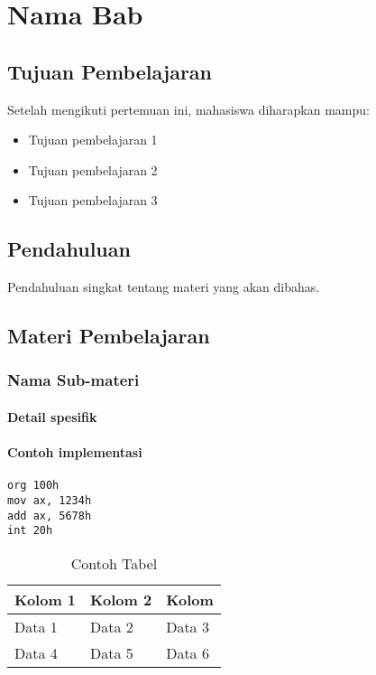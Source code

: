 \chapter{Nama Bab}\label{ch:label-bab}

\section{Tujuan Pembelajaran}\label{sec:label-bab-tujuan}
Setelah mengikuti pertemuan ini, mahasiswa diharapkan mampu:
\begin{itemize}
    \item Tujuan pembelajaran 1
    \item Tujuan pembelajaran 2
    \item Tujuan pembelajaran 3
\end{itemize}

\section{Pendahuluan}\label{sec:label-bab-pendahuluan}
Pendahuluan singkat tentang materi yang akan dibahas.

\section{Materi Pembelajaran}\label{sec:label-bab-materi}
\subsection{Nama Sub-materi}\label{subsec:label-bab-submateri}
\subsubsection{Detail spesifik}

\subsubsection{Contoh implementasi}

\begin{lstlisting}[caption=Contoh Kode Assembly, label={code:contoh}]
org 100h
mov ax, 1234h
add ax, 5678h
int 20h
\end{lstlisting}

\begin{table}[h]
    \centering
    \caption{Contoh Tabel}
    \begin{tabular}{lll}
        \toprule
        \textbf{Kolom 1} & \textbf{Kolom 2} & \textbf{Kolom} \\
        \midrule
        Data 1 & Data 2 & Data 3 \\
        Data 4 & Data 5 & Data 6 \\
        \bottomrule
    \end{tabular}
    \label{tab:contoh}
\end{table}

